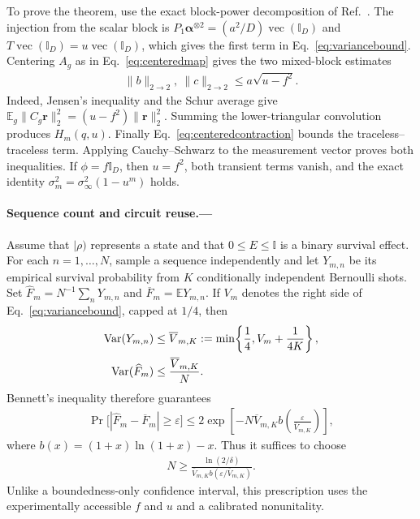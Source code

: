 \documentclass[aps,prl,reprint,superscriptaddress,nofootinbib]{revtex4-2}
\newcommand{\id}{\mathbb{I}}
\newcommand{\vct}{\operatorname{vec}}
\newcommand{\E}{\mathbb{E}}
\newcommand{\Var}{\operatorname{Var}}
\begin{document}
To prove the theorem, use the exact block-power decomposition of
Ref.~\cite{WallmanFlammia2014}.  The injection from the scalar block is
$P_1\bm\alpha^{\otimes2}=(a^2/D)\vct(\id_D)$ and
$T\vct(\id_D)=u\vct(\id_D)$, which gives the first term in
Eq.~\eqref{eq:variancebound}.  Centering $A_g$ as in
Eq.~\eqref{eq:centeredmap} gives the two mixed-block estimates
\begin{align}
 \lVert b\rVert_{2\to2},\ \lVert c\rVert_{2\to2}
 \leq a\sqrt{u-f^2}.
 \label{eq:mixedbound}
\end{align}
Indeed, Jensen's inequality and the Schur average give
$\E_g\lVert C_g\bm r\rVert_2^2=(u-f^2)\lVert\bm r\rVert_2^2$.
Summing the lower-triangular convolution produces $H_m(q,u)$.
Finally Eq.~\eqref{eq:centeredcontraction} bounds the traceless--traceless
term.  Applying Cauchy--Schwarz to the measurement vector proves both
inequalities.  If $\phi=f\id_D$, then $u=f^2$, both transient terms vanish,
and the exact identity $\sigma_m^2=\sigma_\infty^2(1-u^m)$ holds.

\paragraph{Sequence count and circuit reuse.---}
Assume that $|\rho)$ represents a state and that $0\leq E\leq\id$ is a binary
survival effect.  For each $n=1,\ldots,N$, sample a sequence independently and
let $Y_{m,n}$ be its empirical survival probability from $K$ conditionally
independent Bernoulli shots.  Set
$\widehat F_m=N^{-1}\sum_nY_{m,n}$ and
$\overline F_m=\E Y_{m,n}$.  If $V_m$ denotes the right side of
Eq.~\eqref{eq:variancebound}, capped at $1/4$, then
\begin{align}
 \Var(Y_{m,n})&\leq
 \overline V_{m,K}:=\min\!\left\{\frac14,V_m+\frac{1}{4K}\right\},\notag\\
 \Var(\widehat F_m)&\leq\frac{\overline V_{m,K}}{N}.
\end{align}
Bennett's inequality therefore guarantees
\begin{align}
 \Pr\bigl[|\widehat F_m-\overline F_m|\geq\varepsilon\bigr]
 \leq2\exp\!\left[-N\overline V_{m,K}
 b\!\left(\frac{\varepsilon}{\overline V_{m,K}}\right)\right],
 \label{eq:bennett}
\end{align}
where $b(x)=(1+x)\ln(1+x)-x$.  Thus it suffices to choose
\begin{align}
 N\geq\frac{\ln(2/\delta)}{\overline V_{m,K}
 b(\varepsilon/\overline V_{m,K})}.
 \label{eq:Nbound}
\end{align}
Unlike a boundedness-only confidence interval, this prescription uses the
experimentally accessible $f$ and $u$ and a calibrated nonunitality.
\end{document}
